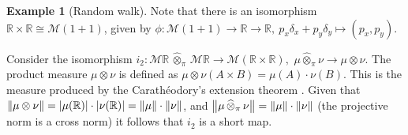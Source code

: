 \documentclass[10pt,a4paper]{amsart}
\theoremstyle{definition}
\theoremstyle{definition}
\newtheorem{example}[definition]{Example}
\theoremstyle{definition}
\theoremstyle{definition}
\theoremstyle{definition}
\theoremstyle{definition}
\begin{document}
\begin{example}[Random walk]
    Note that there is an isomorphism $ \mathbb{R} \times \mathbb{R}  \cong \mathcal{M}(1+1)$, given by $\phi: \mathcal{M}(1+1) \to \mathbb{R} \to \mathbb{R}  ,\ p_x \delta_x + p_y \delta_y  \mapsto (p_x, p_y)$. 

  


    


    


    Consider the isomorphism $i_2: \mathcal{M}\mathbb{R} \,   \widehat{\otimes}_{\pi} \,   \mathcal{M}\mathbb{R} \to  \mathcal{M} \left( \mathbb{R} \times \mathbb{R} \right),$ 
    $\mu  \widehat{\otimes}_{\pi} \nu \to \mu \otimes \nu.$ 
    The product measure $\mu \otimes \nu$ is defined as $\mu  \otimes \nu (A \times B)= \mu(A)\cdot\nu(B).$
    This is the measure produced by the Carath\'{e}odory's extension theorem \cite{aliprantisBanachLattices1999}.
    Given that $\left\lVert \mu \otimes \nu \right\rVert= |\mu (\mathbb{R})|\cdot |\nu (\mathbb{R})| = \left\lVert \mu \right\rVert \cdot \left\lVert \nu \right\rVert$, and $ \left\lVert \mu \, \widehat{\otimes}_{\pi} \, \nu \right\rVert = \left\lVert \mu \right\rVert \cdot \left\lVert \nu \right\rVert$ (the projective norm is a cross norm) it follows that $i_2$ is a short map.



    \begin{comment}
    Next, consider the following commutative diagram:

    \begin{tikzpicture}
      \matrix (m) [matrix of math nodes, row sep=4em, column sep=6em, minimum width=2em]
      {
         \mathcal{M}\mathbb{R} \,   \widehat{\otimes}_{\pi} \,   \mathcal{M}\mathbb{R} &  \mathcal{M} \left( \mathbb{R} \times \mathbb{R} \right)  \\
        \mathcal{M}\mathbb{R} \times \mathcal{M}\mathbb{R}   \\
      };
      \path[dotted, -stealth]
      (m-2-1) edge node [left] {$\widehat{\otimes}_{\pi}$} (m-1-1);
      \path[-stealth]
        (m-1-1) edge node [above] {$i_2$} (m-1-2)
        (m-2-1) edge node [above] {$f$} (m-1-2)
        ;
    \end{tikzpicture}


\end{comment}
\end{example}
\end{document}
